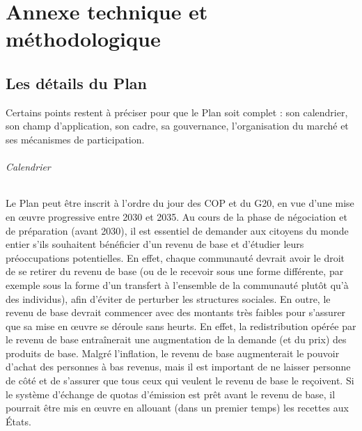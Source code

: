 \documentclass[a5paper,french,openany]{memoir}
\begin{document}
\appendix

\part*{Annexe technique et méthodologique}\label{annexe}

\chapter{Les détails du Plan\label{ch:details}} 

Certains points restent à préciser pour que le Plan soit complet : son calendrier, son champ d'application, son cadre, sa gouvernance, l'organisation du marché et ses mécanismes de participation. 

\paragraph{Calendrier} 
Le Plan peut être inscrit à l'ordre du jour des COP et du G20, en vue d'une mise en œuvre progressive entre 2030 et 2035. Au cours de la phase de négociation et de préparation (avant 2030), il est essentiel de demander aux citoyens du monde entier s'ils souhaitent bénéficier d'un revenu de base et d'étudier leurs préoccupations potentielles. En effet, chaque communauté devrait avoir le droit de se retirer du revenu de base (ou de le recevoir sous une forme différente, par exemple sous la forme d'un transfert à l'ensemble de la communauté plutôt qu'à des individus), afin d'éviter de perturber les structures sociales. En outre, le revenu de base devrait commencer avec des montants très faibles pour s'assurer que sa mise en œuvre se déroule sans heurts. En effet, la redistribution opérée par le revenu de base entraînerait une augmentation de la demande (et du prix) des produits de base. Malgré l'inflation, le revenu de base augmenterait le pouvoir d'achat des personnes à bas revenus, mais il est important de ne laisser personne de côté et de s'assurer que tous ceux qui veulent le revenu de base le reçoivent. Si le système d'échange de quotas d'émission est prêt avant le revenu de base, il pourrait être mis en œuvre en allouant (dans un premier temps) les recettes aux États.
\end{document}
